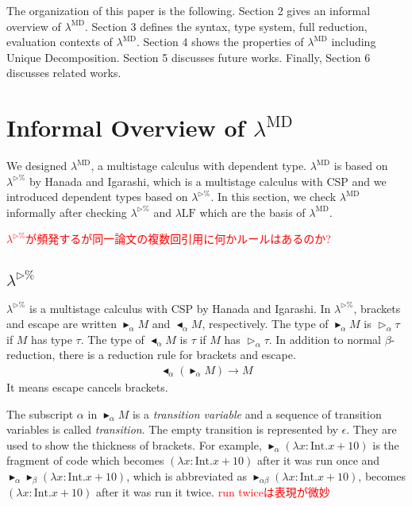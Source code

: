 \documentclass[runningheads]{llncs}
\newcommand{\red}[1]{\textcolor{red}{#1 }}
\newcommand{\LTP}{$\lambda^{\triangleright\%}$\xspace}
\newcommand{\LMD}{$\lambda^{\textrm{MD}}$\xspace}
\newcommand{\LLF}{$\lambda\textrm{LF}$\xspace}
\newcommand{\TW}{\triangleright}
\newcommand{\TB}{\blacktriangleright}
\newcommand{\TBL}{\blacktriangleleft}
\newcommand{\I}{\textrm{Int}}
\begin{document}
The organization of this paper is the following.
Section 2 gives an informal overview of \LMD.
Section 3 defines the syntax, type system, full reduction, evaluation contexts of \LMD.
Section 4 shows the properties of \LMD including Unique Decomposition.
Section 5 discusses future works.
Finally, Section 6 discusses related works.

\section{Informal Overview of \LMD}

We designed \LMD, a multistage calculus with dependent type.
\LMD is based on \LTP\cite{Hanada2014} by Hanada and Igarashi, which is a multistage calculus with CSP and
we introduced dependent types based on \LTP\cite{attapl}.
In this section, we check \LMD informally after checking \LTP and \LLF which are the basis of \LMD.

\red{\LTP\cite{Hanada2014}が頻発するが同一論文の複数回引用に何かルールはあるのか?}
\subsection{\LTP}


\LTP\cite{Hanada2014} is a multistage calculus with CSP by Hanada and Igarashi.
In \LTP, brackets and escape are written $\TB_\alpha M$ and $\TBL_\alpha M$, respectively.
The type of $\TB_\alpha M$ is $\TW_\alpha \tau$ if $M$ has type $\tau$.
The type of $\TBL_\alpha M$ is $\tau$ if $M$ has $\TW_\alpha \tau$.
In addition to normal $\beta$-reduction, there is a reduction rule for brackets and escape.
\begin{align*}
    \TBL_\alpha (\TB_\alpha M) \longrightarrow M
\end{align*}
It means escape cancels brackets.


The subscript $\alpha$ in $\TB_\alpha M$ is a \textit{transition variable} and
a sequence of transition variables is called \textit{transition}.
The empty transition is represented by $\epsilon$.
They are used to show the thickness of brackets.
For example, $\TB_\alpha (\lambda x:\I.x+10)$ is the fragment of code which becomes $(\lambda x:\I.x+10)$ after it was run once and
$\TB_\alpha \TB_\beta (\lambda x:\I.x+10)$, which is abbreviated as $\TB_{\alpha\beta} (\lambda x:\I.x+10)$,
 becomes $(\lambda x:\I.x+10)$ after it was run it twice.
\red{run twiceは表現が微妙}
\end{document}
